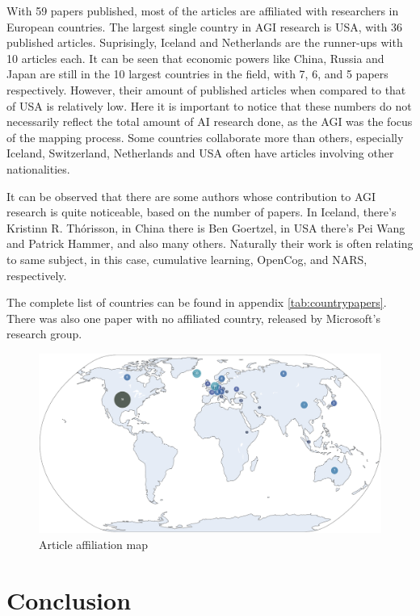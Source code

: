 \documentclass[utf8,english]{gradu3}
\begin{document}
With 59 papers published, most of the articles are affiliated with researchers
in European countries. The largest single country in AGI research is USA, with
36 published articles. Suprisingly, Iceland and Netherlands are the runner-ups
with 10 articles each. It can be seen that economic powers like China, Russia
and Japan are still in the 10 largest countries in the field, with 7, 6, and 5
papers respectively. However, their amount of published articles when compared
to that of USA is relatively low. Here it is important to notice that these
numbers do not necessarily reflect the total amount of AI research done, as the
AGI was the focus of the mapping process. Some countries collaborate more than
others, especially Iceland, Switzerland, Netherlands and USA often have articles
involving other nationalities.

It can be observed that there are some authors whose contribution to AGI
research is quite noticeable, based on the number of papers. In Iceland, there's
Kristinn R. Th\'orisson, in China there is Ben Goertzel, in USA there's Pei Wang
and Patrick Hammer, and also many others. Naturally their work is often relating
to same subject, in this case, cumulative learning, OpenCog, and NARS,
respectively.

The complete list of countries can be found in
appendix \ref*{tab:countrypapers}. There was also one paper with no affiliated
country, released by Microsoft's research group.

\begin{figure}
  \includegraphics[scale=0.60]{material/data/research_map_delta_count.png}
  \caption{Article affiliation map}
  \label{fig:researchmap}
\end{figure}

\chapter{Conclusion}
\label{chap:conclusion}
\end{document}
